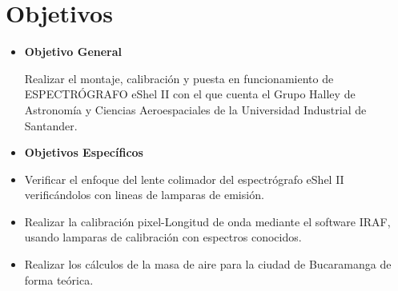 \newpage
\chapter{Objetivos}


\begin{itemize}
\item \textbf{Objetivo General}

Realizar el montaje, calibración y puesta en funcionamiento de ESPECTRÓGRAFO eShel II con el que cuenta el Grupo Halley de Astronomía y Ciencias Aeroespaciales de la Universidad Industrial de Santander.\\

\item \textbf{Objetivos Específicos}
\end{itemize}

\begin{itemize}


\item Verificar el enfoque del lente colimador del espectrógrafo eShel II verificándolos con lineas de lamparas de emisión.

\item Realizar la calibración pixel-Longitud de onda mediante el software IRAF, usando lamparas de calibración con espectros conocidos.

\item Realizar los cálculos de la masa de aire para la ciudad de Bucaramanga de forma teórica.

\end{itemize}
\newpage
